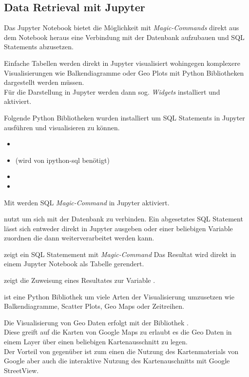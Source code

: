 \subsection{Data Retrieval mit Jupyter}
Das Jupyter Notebook bietet die Möglichkeit mit \textit{Magic-Commands} direkt aus dem Notebook heraus
eine Verbindung mit der Datenbank aufzubauen und \ac{SQL} Statements abzusetzen.

Einfache Tabellen werden direkt in Jupyter visualisiert wohingegen komplexere Visualisierungen wie \zb{}
Balkendiagramme oder Geo Plots mit Python Bibliotheken dargestellt werden müssen.
\\
Für die Darstellung in Jupyter werden dann sog. \textit{Widgets} installiert und aktiviert.

Folgende Python Bibliotheken wurden installiert um \ac{SQL} Statements in Jupyter ausführen und visualisieren zu können.
\begin{itemize}
  \item {}
  \item {} (wird von ipython-sql benötigt)
  \item {}
  \item {}
\end{itemize}

Mit  werden \ac{SQL} \textit{Magic-Command} in Jupyter aktiviert.

 nutzt  um sich mit der Datenbank zu verbinden.
Ein abgesetztes \ac{SQL} Statement lässt sich entweder direkt in Jupyter ausgeben
oder einer beliebigen Variable zuordnen die dann weiterverarbeitet werden kann.

 zeigt ein \ac{SQL} Statemement mit \textit{Magic-Command}
Das Resultat wird direkt in einem Jupyter Notebook als Tabelle gerendert.

 zeigt die Zuweisung eines Resultates zur Variable .



  ist eine Python Bibliothek um viele Arten der Visualisierung umzusetzen
 wie \zb{} Balkendiagramme, Scatter Plots, Geo Maps oder Zeitreihen.

 Die Visualisierung von Geo Daten erfolgt mit der Bibliothek .\\
 Diese greift auf die Karten von Google Maps zu erlaubt es die Geo Daten in einem Layer über einen
 beliebigen Kartenausschnitt zu legen.\\
 Der Vorteil von  gegenüber  ist
 zum einen die Nutzung des Kartenmaterials von Google aber auch die interaktive Nutzung
 des Kartenauschnitts mit \zb{} Google StreetView.

